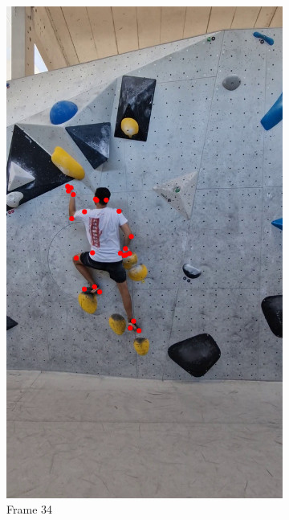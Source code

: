 \documentclass[./main.tex]{subfiles}
\begin{document}
\begin{figure}[htbp]
\begin{subfigure}{0.3\textwidth}
        \includegraphics[width=\textwidth]{entities/CA_34.png}
        \caption{Frame 34}
    \end{subfigure}
    \begin{subfigure}{0.3\textwidth}
        \centering

\end{subfigure}
\end{figure}
\end{document}

